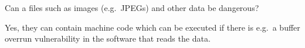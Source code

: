 \question[3]\label{q:software}
Can a files such as images (e.g.\ JPEGs) and other data be dangerous?

\begin{solution}
  Yes, they can contain machine code which can be executed if there is e.g.\ 
  a buffer overrun vulnerability in the software that reads the data.
\end{solution}

